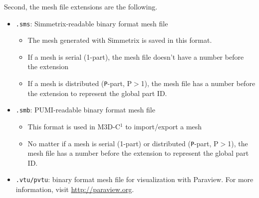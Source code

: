 Second, the mesh file extensions are the following.
\begin{itemize}
\item	\texttt{.sms}: Simmetrix-readable binary format mesh file
\begin{itemize}
\item	The mesh generated with Simmetrix is saved in this format.
\item	If a mesh is serial (1-part), the mesh file doesn't have a number before the extension
\item	If a mesh is distributed (\texttt{P}-part, P$>$1), the mesh file has a number before the extension to represent the global part ID.
\end{itemize}
\item	\texttt{.smb}: PUMI-readable binary format mesh file
\begin{itemize}
\item	This format is used in M3D-C$^{1}$ to import/export a mesh
\item	No matter if a mesh is serial (1-part) or distributed (\texttt{P}-part, P$>$1), the mesh file has a number before the extension to represent the global part ID.
\end{itemize}
\item \texttt{.vtu/pvtu}: binary format mesh file for visualization with Paraview. For more information, visit \href{http://paraview.org}{http://paraview.org}.
\end{itemize}

